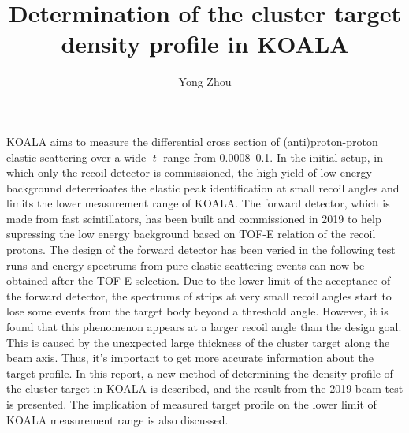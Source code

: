 \documentclass[fleqn,twocolumn,a4paper]{ikpar}
\begin{document}
\parindent=0pt
\frenchspacing

\title{{\bf
    Determination of the cluster target density profile in KOALA
}}
\author{Yong Zhou
}

\maketitle

KOALA aims to measure the differential cross section of (anti)proton-proton elastic
scattering over a wide $|t|$ range from \SIrange{0.0008}{0.1}{\tmom}.
In the initial setup, in which only the recoil detector is commissioned, the high yield of low-energy
background detererioates the elastic peak identification at small recoil angles and limits the lower measurement range of KOALA.
The forward detector, which is made from fast scintillators, has been built and
commissioned in 2019 to help supressing the low energy background based on TOF-E
relation of the recoil protons.
The design of the forward detector has been veried in the following test runs and energy spectrums from pure elastic scattering events can now be obtained after the TOF-E selection.
Due to the lower limit of the acceptance of the forward detector, the spectrums
of strips at very small recoil angles start to lose some events from the
target body beyond a threshold angle.
However, it is found that this phenomenon appears at a larger recoil angle than the design goal.
This is caused by the unexpected large thickness of the cluster target along the beam axis.
Thus, it's important to get more accurate information about the target profile.
In this report, a new method of determining the density profile of the cluster
target in KOALA is described, and the result from the 2019 beam test is presented.
The implication of measured target profile on the lower limit of KOALA measurement range is also discussed.
\end{document}
